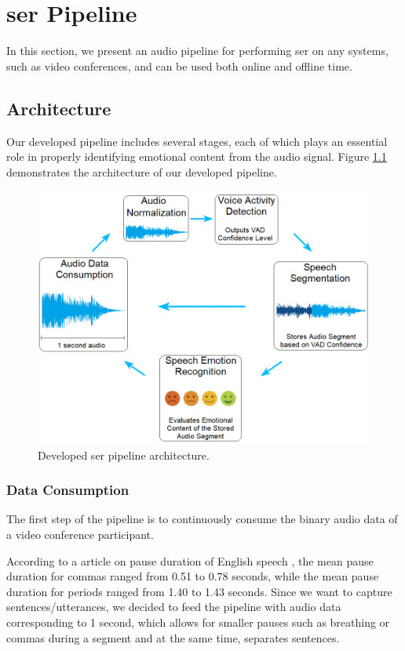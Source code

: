\chapter{\acl{ser} Pipeline}
\label{chapter:ser_conf}

In this section, we present an audio pipeline for performing \ac{ser} on any systems, such as video conferences, and can be used both online and offline time.

\section{Architecture}

Our developed pipeline includes several stages, each of which plays an essential role in properly identifying emotional content from the audio signal. Figure \ref{fig:ser_pipeline} demonstrates the architecture of our developed pipeline.

\begin{figure}[H]
	\centering
	\includegraphics[width=.7\textwidth]{figs/6_video_conf_ser/architecture.png}
	\caption{Developed \ac{ser} pipeline architecture.}
	\label{fig:ser_pipeline}
\end{figure}

\subsection{Data Consumption}

The first step of the pipeline is to continuously consume the binary audio data of a video conference participant.

According to a \citeyear{Liu2022} article on pause duration of English speech \cite{Liu2022}, the mean pause duration for commas ranged from 0.51 to 0.78 seconds, while the mean pause duration for periods ranged from 1.40 to 1.43 seconds. Since we want to capture sentences/utterances, we decided to feed the pipeline with audio data corresponding to 1 second, which allows for smaller pauses such as breathing or commas during a segment and at the same time, separates sentences.

